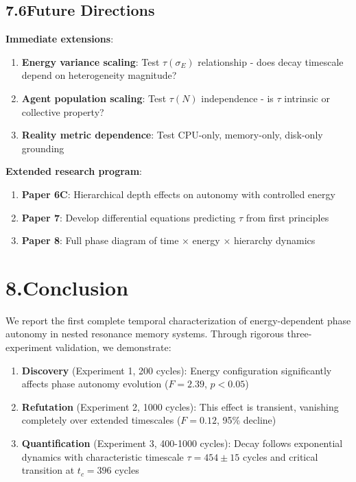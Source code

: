 \documentclass[11pt]{article}
\begin{document}
\subsection*{7.6\quad Future Directions}

\noindent\textbf{Immediate extensions}:

\begin{enumerate}
    \item \textbf{Energy variance scaling}: Test $\tau(\sigma_E)$ relationship - does decay timescale depend on heterogeneity magnitude?
    \item \textbf{Agent population scaling}: Test $\tau(N)$ independence - is $\tau$ intrinsic or collective property?
    \item \textbf{Reality metric dependence}: Test CPU-only, memory-only, disk-only grounding
\end{enumerate}

\noindent\textbf{Extended research program}:

\begin{enumerate}
    \item \textbf{Paper 6C}: Hierarchical depth effects on autonomy with controlled energy
    \item \textbf{Paper 7}: Develop differential equations predicting $\tau$ from first principles
    \item \textbf{Paper 8}: Full phase diagram of time $\times$ energy $\times$ hierarchy dynamics
\end{enumerate}

\section*{8.\quad Conclusion}

We report the first complete temporal characterization of energy-dependent phase autonomy in nested resonance memory systems. Through rigorous three-experiment validation, we demonstrate:

\begin{enumerate}
    \item \textbf{Discovery} (Experiment 1, 200 cycles): Energy configuration significantly affects phase autonomy evolution ($F = 2.39$, $p < 0.05$)

    \item \textbf{Refutation} (Experiment 2, 1000 cycles): This effect is transient, vanishing completely over extended timescales ($F = 0.12$, 95\% decline)

    \item \textbf{Quantification} (Experiment 3, 400-1000 cycles): Decay follows exponential dynamics with characteristic timescale $\tau = 454 \pm 15$ cycles and critical transition at $t_c = 396$ cycles
\end{enumerate}
\end{document}
